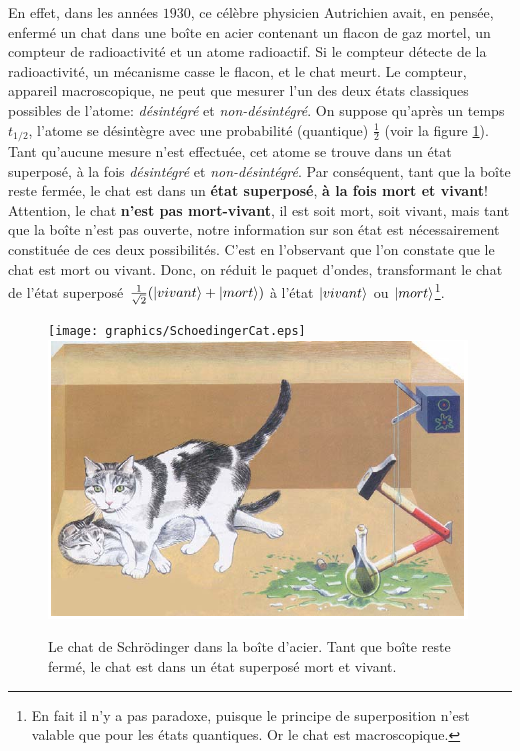 En effet, dans les années $1930$, ce célèbre physicien Autrichien avait, en
pensée, enfermé un chat dans une boîte en acier contenant un flacon de gaz
mortel, un compteur de radioactivité et un atome radioactif. Si le compteur
détecte de la radioactivité, un mécanisme casse le flacon, et le chat meurt. Le
compteur, appareil macroscopique, ne peut que mesurer l'un des deux états
classiques possibles de l'atome: \emph{désintégré} et \emph{non-désintégré}. On
suppose qu'après un temps $t_{1/2}$, l'atome se désintègre avec une probabilité
(quantique) $\frac{1}{2}$ (voir la figure \ref{fig:SchoedingerCat}). Tant
qu'aucune mesure n'est effectuée, cet atome se trouve dans un état superposé, à
la fois \emph{désintégré} et \emph{non-désintégré}. Par conséquent, tant que la
boîte reste fermée, le chat est dans un \textbf{état superposé}, \textbf{à la
fois mort et vivant}! Attention, le chat \textbf{n'est pas mort-vivant}, il est
soit mort, soit vivant, mais tant que la boîte n'est pas ouverte, notre
information sur son état est nécessairement constituée de ces deux possibilités.
C'est en l'observant que l'on constate que le chat est mort ou vivant. Donc, on
réduit le paquet d'ondes, transformant le chat de l'état superposé
$\frac{1}{\sqrt{2}}(\vert vivant\rangle + \vert mort\rangle)$ à l'état $\vert vivant\rangle$ ou
$\vert mort\rangle$\footnote{En fait il n'y a pas paradoxe, puisque le principe de
superposition n'est valable que pour les états quantiques. Or le chat est
macroscopique.}.

\begin{figure}[ptbh]
\centering
\ifcase\msipdfoutput
  \texttt{[image: graphics/SchoedingerCat.eps]}
\else
  \includegraphics[scale=.8]{graphics/SchoedingerCat.png}
\fi
\caption{Le chat de Schrödinger dans la boîte d'acier. Tant que boîte reste
fermé, le chat est dans un état superposé mort et vivant.}
\label{fig:SchoedingerCat}
\end{figure}

